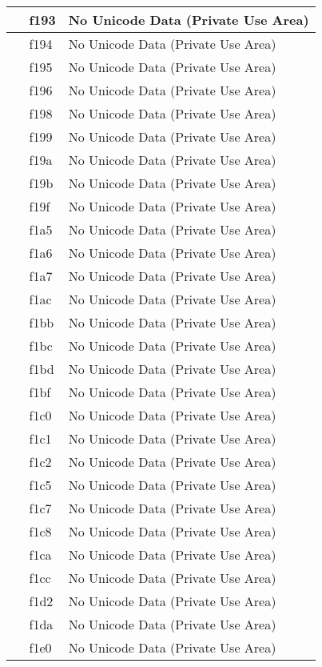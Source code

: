 \documentclass[12pt,letterpaper,openany]{book}
\begin{document}
\begin{center}
\begin{supertabular}{|m{0.25in}|m{0.5in}|m{4in}|}
 & f193 & No Unicode Data (Private Use Area)\\\hline
 & f194 & No Unicode Data (Private Use Area)\\\hline
 & f195 & No Unicode Data (Private Use Area)\\\hline
 & f196 & No Unicode Data (Private Use Area)\\\hline
 & f198 & No Unicode Data (Private Use Area)\\\hline
 & f199 & No Unicode Data (Private Use Area)\\\hline
 & f19a & No Unicode Data (Private Use Area)\\\hline
 & f19b & No Unicode Data (Private Use Area)\\\hline
 & f19f & No Unicode Data (Private Use Area)\\\hline
 & f1a5 & No Unicode Data (Private Use Area)\\\hline
 & f1a6 & No Unicode Data (Private Use Area)\\\hline
 & f1a7 & No Unicode Data (Private Use Area)\\\hline
 & f1ac & No Unicode Data (Private Use Area)\\\hline
 & f1bb & No Unicode Data (Private Use Area)\\\hline
 & f1bc & No Unicode Data (Private Use Area)\\\hline
 & f1bd & No Unicode Data (Private Use Area)\\\hline
 & f1bf & No Unicode Data (Private Use Area)\\\hline
 & f1c0 & No Unicode Data (Private Use Area)\\\hline
 & f1c1 & No Unicode Data (Private Use Area)\\\hline
 & f1c2 & No Unicode Data (Private Use Area)\\\hline
 & f1c5 & No Unicode Data (Private Use Area)\\\hline
 & f1c7 & No Unicode Data (Private Use Area)\\\hline
 & f1c8 & No Unicode Data (Private Use Area)\\\hline
 & f1ca & No Unicode Data (Private Use Area)\\\hline
 & f1cc & No Unicode Data (Private Use Area)\\\hline
 & f1d2 & No Unicode Data (Private Use Area)\\\hline
 & f1da & No Unicode Data (Private Use Area)\\\hline
 & f1e0 & No Unicode Data (Private Use Area)\\\hline

\end{supertabular}
\end{center}
\end{document}
